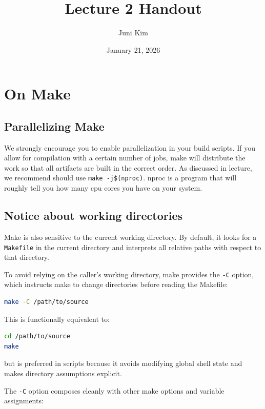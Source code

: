 \documentclass{../juni}
\author{Juni Kim}
\title{Lecture 2 Handout}
\date{January 21, 2026}
\begin{document}
\maketitle

\tableofcontents

\newpage

\section{On Make}

\subsection{Parallelizing Make}

We strongly encourage you to enable parallelization in your build scripts.
If you allow for compilation with a certain number of jobs, make will distribute
the work so that all artifacts are built in the correct order. As discussed in
lecture, we recommend should use \texttt{make -j\$(nproc)}. nproc is a program that will
roughly tell you how many cpu cores you have on your system.

\subsection{Notice about working directories}

Make is also sensitive to the current working directory. By default, it looks
for a \texttt{Makefile} in the current directory and interprets all relative
paths with respect to that directory.

To avoid relying on the caller’s working directory, make provides the
\texttt{-C} option, which instructs make to change directories before reading
the Makefile:

\begin{lstlisting}[language=bash]
make -C /path/to/source
\end{lstlisting}

This is functionally equivalent to:

\begin{lstlisting}[language=bash]
cd /path/to/source
make
\end{lstlisting}

but is preferred in scripts because it avoids modifying global shell state and
makes directory assumptions explicit.

The \texttt{-C} option composes cleanly with other make options and variable
assignments:
\end{document}
